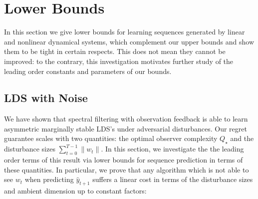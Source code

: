 \documentclass[11pt]{article}
\numberwithin{equation}{section}
\begin{document}
\section{Lower Bounds} \label{sec:lower-bounds}

In this section we give lower bounds for learning sequences generated by linear and nonlinear dynamical systems, which complement our upper bounds and show them to be tight in certain respects. This does not mean they cannot be improved: to the contrary, this investigation motivates further study of the leading order constants and parameters of our bounds.

\subsection{LDS with Noise}

We have shown that spectral filtering with observation feedback is able to learn asymmetric marginally stable LDS's under adversarial disturbances. Our regret guarantee scales with two quantities: the optimal observer complexity $Q_\star$ and the disturbance sizes $ \sum_{t=0}^{T-1} \|w_t\|$. In this section, we investigate the the leading order terms of this result via lower bounds for sequence prediction in terms of these quantities. 
In particular, we prove that any algorithm which is not able to see $w_t$ when predicting $\hat{y}_{t+1}$ suffers a linear cost in terms of the disturbance sizes and ambient dimension up to constant factors:
\end{document}

